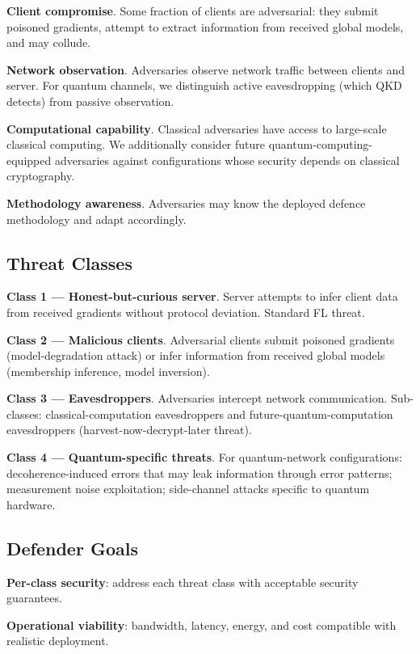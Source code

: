 \documentclass[sigconf,nonacm]{acmart}
\begin{document}
\textbf{Client compromise}. Some fraction of clients are
adversarial: they submit poisoned gradients, attempt to extract
information from received global models, and may collude.

\textbf{Network observation}. Adversaries observe network
traffic between clients and server. For quantum channels, we
distinguish active eavesdropping (which QKD detects) from
passive observation.

\textbf{Computational capability}. Classical adversaries have
access to large-scale classical computing. We additionally
consider future quantum-computing-equipped adversaries against
configurations whose security depends on classical cryptography.

\textbf{Methodology awareness}. Adversaries may know the deployed
defence methodology and adapt accordingly.

\subsection{Threat Classes}

\textbf{Class 1 --- Honest-but-curious server}. Server attempts
to infer client data from received gradients without protocol
deviation. Standard FL threat.

\textbf{Class 2 --- Malicious clients}. Adversarial clients
submit poisoned gradients (model-degradation attack) or
infer information from received global models (membership
inference, model inversion).

\textbf{Class 3 --- Eavesdroppers}. Adversaries intercept
network communication. Sub-classes: classical-computation
eavesdroppers and future-quantum-computation eavesdroppers
(harvest-now-decrypt-later threat).

\textbf{Class 4 --- Quantum-specific threats}. For
quantum-network configurations: decoherence-induced errors that
may leak information through error patterns; measurement noise
exploitation; side-channel attacks specific to quantum hardware.

\subsection{Defender Goals}

\textbf{Per-class security}: address each threat class with
acceptable security guarantees.

\textbf{Operational viability}: bandwidth, latency, energy, and
cost compatible with realistic deployment.
\end{document}
